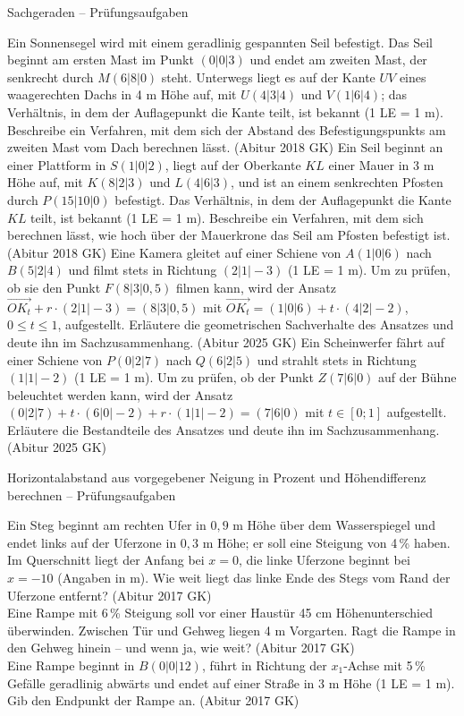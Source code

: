 \begin{aufgabe}{Sachgeraden – Prüfungsaufgaben}
\begin{teile}
\teil Ein Sonnensegel wird mit einem geradlinig gespannten Seil befestigt. Das Seil beginnt am ersten Mast im Punkt $(0 | 0 | 3)$ und endet am zweiten Mast, der senkrecht durch $M(6 | 8 | 0)$ steht. Unterwegs liegt es auf der Kante $UV$ eines waagerechten Dachs in 4 m Höhe auf, mit $U(4 | 3 | 4)$ und $V(1 | 6 | 4)$; das Verhältnis, in dem der Auflagepunkt die Kante teilt, ist bekannt (1 LE = 1 m). Beschreibe ein Verfahren, mit dem sich der Abstand des Befestigungspunkts am zweiten Mast vom Dach berechnen lässt. \hfill (Abitur 2018 GK)
\teil Ein Seil beginnt an einer Plattform in $S(1 | 0 | 2)$, liegt auf der Oberkante $KL$ einer Mauer in 3 m Höhe auf, mit $K(8 | 2 | 3)$ und $L(4 | 6 | 3)$, und ist an einem senkrechten Pfosten durch $P(15 | 10 | 0)$ befestigt. Das Verhältnis, in dem der Auflagepunkt die Kante $KL$ teilt, ist bekannt (1 LE = 1 m). Beschreibe ein Verfahren, mit dem sich berechnen lässt, wie hoch über der Mauerkrone das Seil am Pfosten befestigt ist. \hfill (Abitur 2018 GK)
\teil Eine Kamera gleitet auf einer Schiene von $A(1 | 0 | 6)$ nach $B(5 | 2 | 4)$ und filmt stets in Richtung $(2 | 1 | -3)$ (1 LE = 1 m). Um zu prüfen, ob sie den Punkt $F(8 | 3 | 0{,}5)$ filmen kann, wird der Ansatz $\vec{OK_t} + r \cdot (2 | 1 | -3) = (8 | 3 | 0{,}5)$ mit $\vec{OK_t} = (1 | 0 | 6) + t \cdot (4 | 2 | -2)$, $0 \le t \le 1$, aufgestellt. Erläutere die geometrischen Sachverhalte des Ansatzes und deute ihn im Sachzusammenhang. \hfill (Abitur 2025 GK)
\teil Ein Scheinwerfer fährt auf einer Schiene von $P(0 | 2 | 7)$ nach $Q(6 | 2 | 5)$ und strahlt stets in Richtung $(1 | 1 | -2)$ (1 LE = 1 m). Um zu prüfen, ob der Punkt $Z(7 | 6 | 0)$ auf der Bühne beleuchtet werden kann, wird der Ansatz $(0 | 2 | 7) + t \cdot (6 | 0 | -2) + r \cdot (1 | 1 | -2) = (7 | 6 | 0)$ mit $t \in [0; 1]$ aufgestellt. Erläutere die Bestandteile des Ansatzes und deute ihn im Sachzusammenhang. \hfill (Abitur 2025 GK)
\end{teile}
\end{aufgabe}

\begin{aufgabe}{Horizontalabstand aus vorgegebener Neigung in Prozent und Höhendifferenz berechnen – Prüfungsaufgaben}
\begin{teile}
\teil Ein Steg beginnt am rechten Ufer in $0{,}9$ m Höhe über dem Wasserspiegel und endet links auf der Uferzone in $0{,}3$ m Höhe; er soll eine Steigung von 4\,\% haben. Im Querschnitt liegt der Anfang bei $x = 0$, die linke Uferzone beginnt bei $x = -10$ (Angaben in m). Wie weit liegt das linke Ende des Stegs vom Rand der Uferzone entfernt? \hfill (Abitur 2017 GK) \\ \leerfeld[m]
\teil Eine Rampe mit 6\,\% Steigung soll vor einer Haustür 45 cm Höhenunterschied überwinden. Zwischen Tür und Gehweg liegen 4 m Vorgarten. Ragt die Rampe in den Gehweg hinein – und wenn ja, wie weit? \hfill (Abitur 2017 GK) \\ \leerfeld[m]
\teil Eine Rampe beginnt in $B(0 | 0 | 12)$, führt in Richtung der $x_1$-Achse mit 5\,\% Gefälle geradlinig abwärts und endet auf einer Straße in 3 m Höhe (1 LE = 1 m). Gib den Endpunkt der Rampe an. \hfill (Abitur 2017 GK)
\end{teile}
\end{aufgabe}
